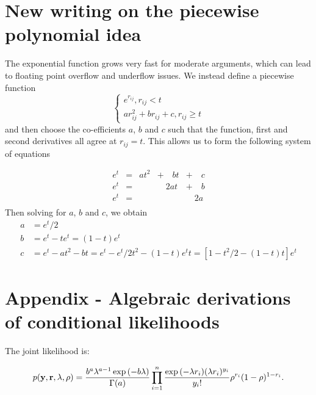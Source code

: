 \documentclass{amsart}[12pt]
\begin{document}
\section{New writing on the piecewise polynomial idea}
The exponential function grows very fast for moderate arguments, which can lead to floating point overflow
and underflow issues. We instead define a piecewise function
\[
	\begin{cases}
		e^{r_{ij}}, r_{ij} < t \\
		a r_{ij}^2 + b r_{ij} + c, r_{ij} \geq t
	\end{cases}
\]
and then choose the co-efficients $a$, $b$ and $c$ such that the function, first and second derivatives all
agree at $r_{ij} = t$. This allows us to form the following system of equations

\[
	\begin{array}{lllll}
		e^t &= &a t^2 &+ \quad b t &+ \quad c \\
		e^t &= &&\quad 2a t &+ \quad b \\
		e^t &= &&&\quad 2a \\
	\end{array}
\]
Then solving for $a$, $b$ and $c$, we obtain
\begin{align*}
	a &= e^t / 2 \\
	b &= e^t - t e^t = (1 - t) e^t \\
	c &= e^t - at^2 - bt = e^t - e^t/2 t^2 - (1 - t) e^t t = [1 - t^2/2 - (1 - t) t] e^t
\end{align*}

\section{Appendix - Algebraic derivations of conditional likelihoods}

The joint likelihood is:

$$
p({\bf y}, {\bf r}, \lambda, \rho) = \frac{b^a \lambda^{a - 1} \exp{(-b \lambda)}}{\Gamma{(a)}} \prod_{i=1}^n \frac{\exp{(-\lambda r_i)} (\lambda r_i)^{y_i}}{y_i !} \rho^{r_i} (1 - \rho)^{1 - r_i}.
$$
\end{document}
